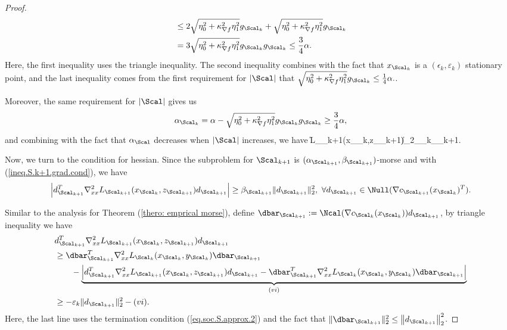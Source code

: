\begin{proof}
\begin{align*}
	&\le 2\sqrt{\eta_0^2+\kappa_{\nabla f}^2\eta_1^2}g_{\Scal_k}+ \sqrt{\eta_0^2+\kappa_{\nabla f}^2\eta_1^2}g_{\Scal_k}\\
	&=3\sqrt{\eta_0^2+\kappa_{\nabla f}^2\eta_1^2}g_{\Scal_k}g_{\Scal_k}\le\frac{3}{4}\alpha.
\end{align*}
Here, the first inequality uses the triangle inequality. The second inequality combines with the fact that $x_{\Scal_k}$ is a $(\epsilon_k,\varepsilon_k)$ stationary point, and the last inequality comes from the first requirement for $|\Scal|$ that $\sqrt{\eta_0^2+\kappa_{\nabla f}^2\eta_1^2}g_{\Scal_k}\le\frac{1}{4}\alpha.$.
 
 Moreover, the same requirement for $|\Scal|$ gives us
\[
\alpha_{\Scal_k}=\alpha-\sqrt{\eta_0^2+\kappa_{\nabla f}^2\eta_1^2}g_{\Scal_k}g_{\Scal_k}\ge\frac{3}{4}\alpha,
\]
and combining with the fact that $\alpha_{\Scal}$ decreases when $|\Scal|$ increases, we have
\bequation
\label{ineq.S.k+1.grad.cond}
\|\nabla L_{\Scal_{k+1}}(x_{\Scal_{k}},z_{\Scal_{k+1}})\|_2\le\alpha_{\Scal_k}\le\alpha_{\Scal_{k+1}}.
\eequation

Now, we turn to the condition for hessian. Since the subproblem for $\Scal_{k+1}$ is $(\alpha_{\Scal_{k+1}},\beta_{\Scal_{k+1}})$-morse and with (\ref{ineq.S.k+1.grad.cond}), we have
\[
\left|d_{\Scal_{k+1}}^T\nabla^2_{xx} L_{\Scal_{k+1}}(x_{\Scal_{k}},z_{\Scal_{k+1}})d_{\Scal_{k+1}}\right|\ge \beta_{\Scal_{k+1}}\|d_{\Scal_{k+1}}\|_2^2,\ \forall d_{\Scal_{k+1}}\in\Null(\nabla c_{\Scal_{k+1}}(x_{\Scal_k})^T).
\]

 Similar to the analysis for Theorem (\ref{thero: emprical morse}), define $\dbar_{\Scal_{k+1}}:=\Ncal(\nabla c_{\Scal_{k}}(x_{\Scal_{k}}))d_{\Scal_{k+1}}$, by triangle inequality we have
\begin{align*}
&d_{\Scal_{k+1}}^T\nabla^2_{xx}L_{\Scal_{k+1}}(x_{\Scal_{k}},z_{\Scal_{k+1}})d_{\Scal_{k+1}}\\
	&\ge  \dbar_{\Scal_{k+1}}^T\nabla^2_{xx}L_{\Scal_{k}}(x_{\Scal_{k}},y_{\Scal_{k}})\dbar_{\Scal_{k+1}} \\
	&\hspace{2em} -\underbrace{\left|d_{\Scal_{k+1}}^T\nabla^2_{xx}L_{\Scal_{k+1}}(x_{\Scal_{k}},z_{\Scal_{k+1}})d_{\Scal_{k+1}}-\dbar_{\Scal_{k+1}}^T\nabla^2_{xx}L_{\Scal_{k}}(x_{\Scal_{k}},y_{\Scal_{k}})\dbar_{\Scal_{k+1}}\right|}_{(vi)}\\
	&\ge -\varepsilon_k\|d_{\Scal_{k+1}}\|_2^2-(vi).
\end{align*}
Here, the last line uses the termination condition (\ref{eq.soc.S.approx.2}) and the fact that $\|\dbar_{\Scal_{k+1}}\|_2^2\le \left\|d_{\Scal_{k+1}}\right\|_2^2 $.


\end{proof}
